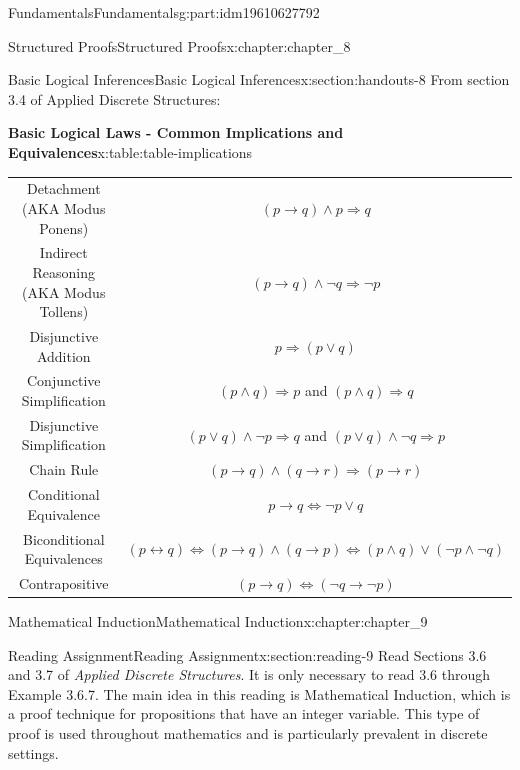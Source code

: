 \documentclass[oneside,10pt,]{book}
\newcommand{\tabularfont}{\relax}
\numberwithin{equation}{section}
\newcommand{\hrulemedium}{\noalign{\hrule height 0.07em}}
\begin{document}
\begin{partptx}{Fundamentals}{}{Fundamentals}{}{}{g:part:idm19610627792}
\begin{chapterptx}{Structured Proofs}{}{Structured Proofs}{}{}{x:chapter:chapter_8}
\typeout{************************************************}
%
\begin{sectionptx}{Basic Logical Inferences}{}{Basic Logical Inferences}{}{}{x:section:handouts-8}
From section 3.4 of Applied Discrete Structures:%
\begin{tableptx}{\textbf{Basic Logical Laws - Common Implications and Equivalences}}{x:table:table-implications}{}%
%
%
%
%
\centering%
{\tabularfont%
\begin{tabular}{cc}
Detachment (AKA Modus Ponens)&\((p \rightarrow  q) \land  p\Rightarrow  q\)\tabularnewline\hrulemedium
Indirect Reasoning (AKA Modus Tollens)&\((p \to  q) \land  \neg q \Rightarrow  \neg p\)\tabularnewline\hrulemedium
Disjunctive Addition&\(p\Rightarrow (p\lor q)\)\tabularnewline\hrulemedium
Conjunctive Simplification&\((p \land  q) \Rightarrow  p\) and \((p \land  q) \Rightarrow  q\)\tabularnewline\hrulemedium
Disjunctive Simplification&\((p \lor  q) \land  \neg p \Rightarrow  q\) and \((p \lor q) \land \neg q\Rightarrow p\)\tabularnewline\hrulemedium
Chain Rule&\((p \to  q) \land  ( q \rightarrow  r) \Rightarrow  (p\to  r)\)\tabularnewline\hrulemedium
Conditional Equivalence&\(p \rightarrow  q \Leftrightarrow  \neg p \lor  q\)\tabularnewline\hrulemedium
Biconditional Equivalences&\((p \leftrightarrow  q) \Leftrightarrow  (p\rightarrow q) \land  (q \rightarrow  p)\Leftrightarrow (p \land  q) \lor  (\neg p \land  \neg q)\)\tabularnewline\hrulemedium
Contrapositive&\((p\to q) \Leftrightarrow (\neg q \to \neg p)\)
\end{tabular}
}%
\end{tableptx}%
\end{sectionptx}
\end{chapterptx}
%
\typeout{************************************************}
\typeout{************************************************}
%
\begin{chapterptx}{Mathematical Induction}{}{Mathematical Induction}{}{}{x:chapter:chapter_9}
\index{}%
%
%
\typeout{************************************************}
\typeout{************************************************}
%
\begin{sectionptx}{Reading Assignment}{}{Reading Assignment}{}{}{x:section:reading-9}
Read Sections 3.6 and 3.7 of \emph{Applied Discrete Structures}. It is only necessary to read 3.6 through Example 3.6.7.   The main idea in this reading is Mathematical Induction, which is a proof technique for propositions that have an integer variable.  This type of proof is used throughout mathematics and is particularly prevalent in discrete settings.%

\end{sectionptx}
\end{chapterptx}
\end{partptx}
\end{document}
